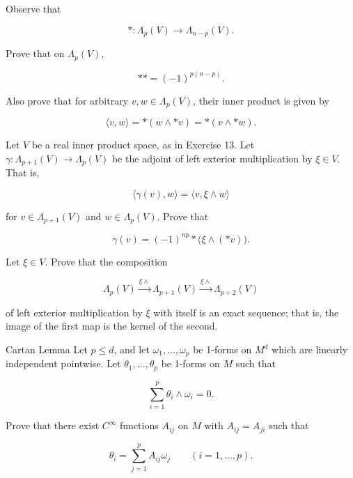 \begin{problemset}
Observe that

\begin{equation}
\ast\colon\Lambda_{p}(V)\to\Lambda_{n-p}(V).
\end{equation}

Prove that on  $ \Lambda_{p}(V) $,

\begin{equation}
**=(-1)^{p(n-p)}.
\end{equation}

Also prove that for arbitrary $v, w \in \Lambda_{p}(V)$, their inner product is given by


\[
\langle v,w\rangle=\ast(w\wedge\ast v)=\ast(v\wedge\ast w).
\]

\item Let $V$ be a real inner product space, as in Exercise 13. Let $\gamma: \Lambda_{p+1}(V) \to \Lambda_p(V)$ be the adjoint of left exterior multiplication by $\xi \in V$. That is,

\[
\langle\gamma(v),w\rangle=\langle v,\xi\wedge w\rangle
\]

for  $ v \in \Lambda_{p+1}(V) $ and  $ w \in \Lambda_p(V) $. Prove that

\[
\gamma(v)=(-1)^{np}*\big(\xi\wedge(*v)\big).
\]

\item Let  $ \xi \in V $. Prove that the composition

\[
\Lambda_{p}(V)\xrightarrow{\xi\land}\Lambda_{p+1}(V)\xrightarrow{\xi\land}\Lambda_{p+2}(V)
\]

of left exterior multiplication by $\xi$ with itself is an exact sequence; that is, the image of the first map is the kernel of the second.

\item Cartan Lemma Let $p \leq d$, and let $\omega_{1}, \ldots, \omega_{p}$ be 1-forms on $M^{d}$ which are linearly independent pointwise. Let $\theta_{1}, \ldots, \theta_{p}$ be 1-forms on $M$ such that

\[
\sum_{i=1}^{p}\theta_{i}\wedge\omega_{i}=0.
\]

Prove that there exist $C^{\infty}$ functions $A_{ij}$ on $M$ with $A_{ij}=A_{ji}$ such that

\[
\theta_{i}=\sum_{j=1}^{p}A_{i j}\omega_{j}\qquad(i=1,\ldots,p).
\]

\end{problemset}
